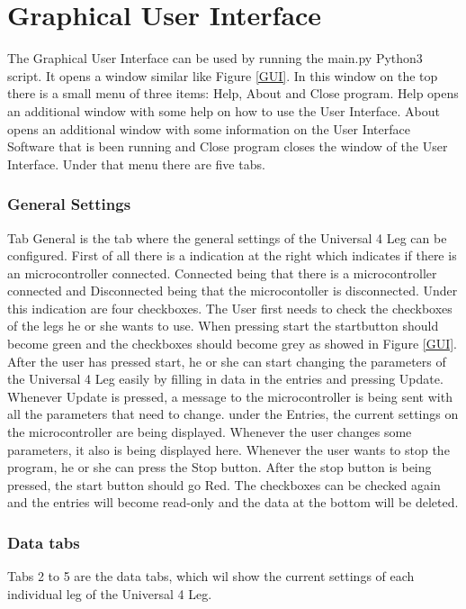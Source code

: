 \documentclass{article}
\begin{document}
\section{Graphical User Interface}

The Graphical User Interface can be used by running the main.py Python3 script. It opens a window similar like Figure \ref{GUI}. In this window on the top there is a small menu of three items: Help, About and Close program. Help opens an additional window with some help on how to use the User Interface. About opens an additional window with some information on the User Interface Software that is been running and Close program closes the window of the User Interface. Under that menu there are five tabs. 

\subsubsection{General Settings}
Tab General is the tab where the general settings of the Universal 4 Leg can be configured. First of all there is a indication at the right which indicates if there is an microcontroller connected. Connected being that there is a microcontroller connected and Disconnected being that the microcontoller is disconnected. Under this indication are four checkboxes. The User first needs to check the checkboxes of the legs he or she wants to use. When pressing start the startbutton should become green and the checkboxes should become grey as showed in Figure \ref{GUI}. After the user has pressed start, he or she can start changing the parameters of the Universal 4 Leg easily by filling in data in the entries and pressing Update. Whenever Update is pressed, a message to the microcontroller is being sent with all the parameters that need to change. under the Entries, the current settings on the microcontroller are being displayed. Whenever the user changes some parameters, it also is being displayed here. Whenever the user wants to stop the program, he or she can press the Stop button. After the stop button is being pressed, the start button should go Red. The checkboxes can be checked again and the entries will become read-only and the data at the bottom will be deleted.

\subsubsection{Data tabs}
Tabs 2 to 5 are the data tabs, which wil show the current settings of each individual leg of the Universal 4 Leg.
\end{document}

